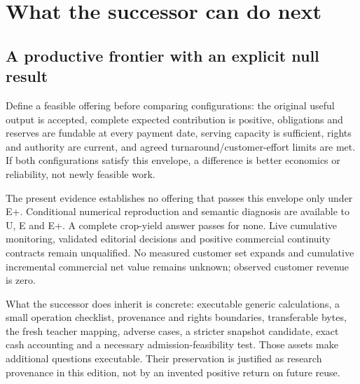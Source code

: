 \section{What the successor can do next}

\subsection{A productive frontier with an explicit null result}

Define a feasible offering before comparing configurations: the original useful output is accepted, complete expected contribution is positive, obligations and reserves are fundable at every payment date, serving capacity is sufficient, rights and authority are current, and agreed turnaround/customer-effort limits are met. If both configurations satisfy this envelope, a difference is better economics or reliability, not newly feasible work.

The present evidence establishes no offering that passes this envelope only under E+. Conditional numerical reproduction and semantic diagnosis are available to U, E and E+. A complete crop-yield answer passes for none. Live cumulative monitoring, validated editorial decisions and positive commercial continuity contracts remain unqualified. No measured customer set expands and cumulative incremental commercial net value remains unknown; observed customer revenue is zero.

What the successor does inherit is concrete: executable generic calculations, a small operation checklist, provenance and rights boundaries, transferable bytes, the fresh teacher mapping, adverse cases, a stricter snapshot candidate, exact cash accounting and a necessary admission-feasibility test. Those assets make additional questions executable. Their preservation is justified as research provenance in this edition, not by an invented positive return on future reuse.

